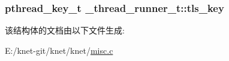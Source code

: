 \subsubsection[{tls\+\_\+key}]{\setlength{\rightskip}{0pt plus 5cm}pthread\+\_\+key\+\_\+t \+\_\+thread\+\_\+runner\+\_\+t\+::tls\+\_\+key}\label{a00047_ad7461a4eef9b83e07f0acd4f26923744_ad7461a4eef9b83e07f0acd4f26923744}


该结构体的文档由以下文件生成\+:\begin{DoxyCompactItemize}
\item 
E\+:/knet-\/git/knet/knet/\hyperlink{a00099}{misc.\+c}\end{DoxyCompactItemize}
